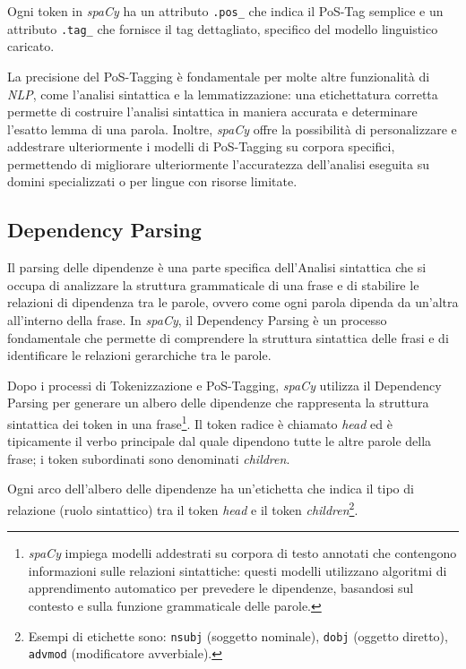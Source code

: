 \documentclass[12pt]{report}
\newcommand{\spacy}{\textsl{spaCy}\xspace}
\newcommand{\nlp}{\textsl{NLP}\xspace}
\begin{document}
Ogni token in \spacy ha un attributo \texttt{.pos\_} che indica il PoS-Tag semplice e un attributo \texttt{.tag\_} che fornisce il tag dettagliato, specifico del modello linguistico caricato.

La precisione del PoS-Tagging è fondamentale per molte altre funzionalità di \nlp, come l'analisi sintattica e la lemmatizzazione: una etichettatura corretta permette di costruire l'analisi sintattica in maniera accurata e determinare l'esatto lemma di una parola. Inoltre, \spacy offre la possibilità di personalizzare e addestrare ulteriormente i modelli di PoS-Tagging su corpora specifici, permettendo di migliorare ulteriormente l'accuratezza dell'analisi eseguita su domini specializzati o per lingue con risorse limitate.


\subsection{Dependency Parsing}
Il parsing delle dipendenze è una parte specifica dell'\textsf{Analisi sintattica} che si occupa di analizzare la struttura grammaticale di una frase e di stabilire le relazioni di dipendenza tra le parole, ovvero come ogni parola dipenda da un'altra all'interno della frase. In \spacy, il Dependency Parsing è un processo fondamentale che permette di comprendere la struttura sintattica delle frasi e di identificare le relazioni gerarchiche tra le parole.

Dopo i processi di Tokenizzazione e PoS-Tagging, \spacy utilizza il Dependency Parsing per generare un albero delle dipendenze che rappresenta la struttura sintattica dei token in una frase\footnote{\spacy impiega modelli addestrati su corpora di testo annotati che contengono informazioni sulle relazioni sintattiche: questi modelli utilizzano algoritmi di apprendimento automatico per prevedere le dipendenze, basandosi sul contesto e sulla funzione grammaticale delle parole.}. Il token radice è chiamato \textit{head} ed è tipicamente il verbo principale dal quale dipendono tutte le altre parole della frase; i token subordinati sono denominati \textit{children}.

Ogni arco dell'albero delle dipendenze ha un'etichetta che indica il tipo di relazione (ruolo sintattico) tra il token \textit{head} e il token \textit{children}\footnote{Esempi di etichette sono: \texttt{nsubj} (soggetto nominale), \texttt{dobj} (oggetto diretto), \texttt{advmod} (modificatore avverbiale).}.

\end{document}
